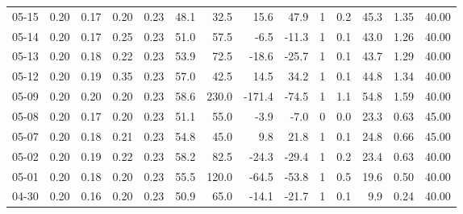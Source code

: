 \begin{threeparttable}
{\begin{tabular}{lrrrrrrrrrrrrr}
  05-15 &          0.20 &          0.17 &          0.20 &        0.23 &                48.1 &                32.5 &       15.6 &         47.9 &              1 &                 0.2 &             45.3 &            1.35 &                  40.00 \\
  05-14 &          0.20 &          0.17 &          0.25 &        0.23 &                51.0 &                57.5 &       -6.5 &        -11.3 &              1 &                 0.1 &             43.0 &            1.26 &                  40.00 \\
  05-13 &          0.20 &          0.18 &          0.22 &        0.23 &                53.9 &                72.5 &      -18.6 &        -25.7 &              1 &                 0.1 &             43.7 &            1.29 &                  40.00 \\
  05-12 &          0.20 &          0.19 &          0.35 &        0.23 &                57.0 &                42.5 &       14.5 &         34.2 &              1 &                 0.1 &             44.8 &            1.34 &                  40.00 \\
  05-09 &          0.20 &          0.20 &          0.20 &        0.23 &                58.6 &               230.0 &     -171.4 &        -74.5 &              1 &                 1.1 &             54.8 &            1.59 &                  40.00 \\
  05-08 &          0.20 &          0.17 &          0.20 &        0.23 &                51.1 &                55.0 &       -3.9 &         -7.0 &              0 &                 0.0 &             23.3 &            0.63 &                  45.00 \\
  05-07 &          0.20 &          0.18 &          0.21 &        0.23 &                54.8 &                45.0 &        9.8 &         21.8 &              1 &                 0.1 &             24.8 &            0.66 &                  45.00 \\
  05-02 &          0.20 &          0.19 &          0.22 &        0.23 &                58.2 &                82.5 &      -24.3 &        -29.4 &              1 &                 0.2 &             23.4 &            0.63 &                  40.00 \\
  05-01 &          0.20 &          0.18 &          0.20 &        0.23 &                55.5 &               120.0 &      -64.5 &        -53.8 &              1 &                 0.5 &             19.6 &            0.50 &                  40.00 \\
  04-30 &          0.20 &          0.16 &          0.20 &        0.23 &                50.9 &                65.0 &      -14.1 &        -21.7 &              1 &                 0.1 &              9.9 &            0.24 &                  40.00 \\

\end{tabular}}
\end{threeparttable}

